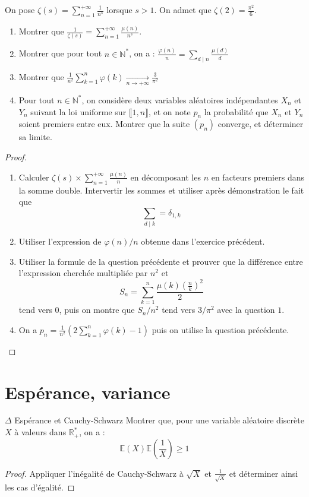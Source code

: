 \documentclass[french,a4paper]{article}
\newcommand{\N}{\mathbb{N}}
\newcommand{\R}{\mathbb{R}}
\newcommand{\st}{^*}
\newcommand{\E}{\mathbb{E}}
\theoremstyle{plain}
\theoremstyle{definition}
\theoremstyle{remark}
\begin{document}
\begin{ex}[Châteaux]{}
	On pose $\zeta(s)=\displaystyle\sum_{n=1}^{+\infty}\frac{1}{n^s}$ lorsque $s>1$. On admet que $\zeta(2)=\displaystyle\frac{\pi^2}{6}$.
	\begin{enumerate}
		\item Montrer que $\displaystyle\frac{1}{\zeta(s)}=\sum_{n=1}^{+\infty}\frac{\mu(n)}{n^s}$.
		\item Montrer que pour tout $n\in\N\st$, on a : $\displaystyle\frac{\varphi(n)}{n}=\sum_{d\mid n}\frac{\mu(d)}{d}$
		\item Montrer que $\displaystyle \frac{1}{n^2}\sum_{k=1}^{n}\varphi(k)\xrightarrow[n\to+\infty]{}\frac{3}{\pi^2}$
		\item Pour tout $n\in\N\st$, on considère deux variables aléatoires indépendantes $X_n$ et $Y_n$ suivant la loi uniforme sur $\llbracket1,n\rrbracket$, et on note $p_n$ la probabilité que $X_n$ et $Y_n$ soient premiers entre eux. Montrer que la suite $(p_n)$ converge, et déterminer sa limite.
	\end{enumerate}
\end{ex}
\begin{proof}
	\begin{enumerate}
		\item Calculer $\zeta(s)\times\displaystyle\sum_{n=1}^{+\infty}\frac{\mu(n)}{n}$ en décomposant les $n$ en facteurs premiers dans la somme double. Intervertir les sommes et utiliser après démonstration le fait que $$\sum_{d\mid k}=\delta_{1,k}$$
		\item Utiliser l'expression de $\varphi(n)/n$ obtenue dans l'exercice précédent.
		\item Utiliser la formule de la question précédente et prouver que la différence entre l'expression cherchée multipliée par $n^2$ et $$S_n=\sum_{k=1}^{n}\frac{\mu(k)\left(\frac{n}{k}\right)^2}{2}$$ tend vers $0$, puis on montre que $S_n/n^2$ tend vers $3/\pi^2$ avec la question $1$.
		\item On a $p_n=\displaystyle\frac{1}{n^2}\left(2\sum_{k=1}^{n}\varphi(k)-1\right)$ puis on utilise la question précédente.
	\end{enumerate}
\end{proof}

\section{Espérance, variance}

\begin{ex}{$\Delta$ Espérance et Cauchy-Schwarz}
	Montrer que, pour une variable aléatoire discrète $X$ à valeurs dans $\R_+\st$, on a : $$\E(X)\E\left(\frac{1}{X}\right)\geqslant 1$$
\end{ex}
\begin{proof}
	Appliquer l'inégalité de Cauchy-Schwarz à $\sqrt{X}$ et $\displaystyle\frac{1}{\sqrt{X}}$ et déterminer ainsi les cas d'égalité.
\end{proof}
\end{document}
